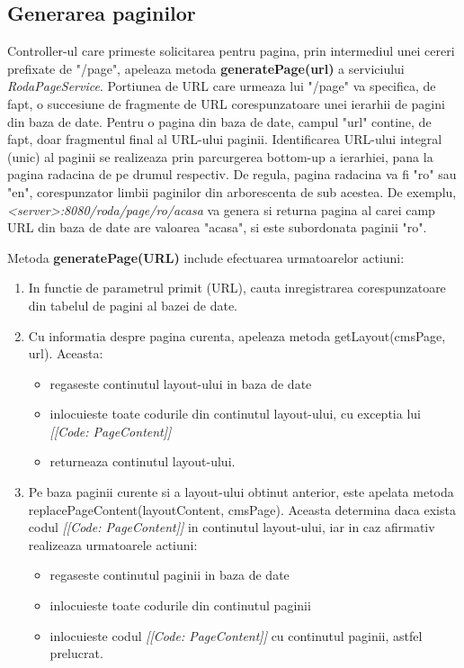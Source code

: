 \subsection{Generarea paginilor}
\label{generarea_paginilor}

Controller-ul care primeste solicitarea pentru pagina, prin intermediul unei cereri prefixate de "/page", apeleaza metoda \textbf{generatePage(url)} a serviciului \emph{RodaPageService}. 
Portiunea de URL care urmeaza lui "/page" va specifica, de fapt, o succesiune de fragmente de URL corespunzatoare unei ierarhii de pagini din baza de date. 
Pentru o pagina din baza de date, campul "url" contine, de fapt, doar fragmentul final al URL-ului paginii. 
Identificarea URL-ului integral (unic) al paginii se realizeaza prin parcurgerea bottom-up a ierarhiei, pana la pagina radacina de pe drumul respectiv. 
De regula, pagina radacina va fi "ro" sau "en", corespunzator limbii paginilor din arborescenta de sub acestea. 
De exemplu, \emph{<server>:8080/roda/page/ro/acasa} va genera si returna pagina al carei camp URL din baza de date are valoarea "acasa", si este subordonata paginii "ro". 

Metoda \textbf{generatePage(URL)} include efectuarea urmatoarelor actiuni:

\begin{enumerate}
\item{In functie de parametrul primit (URL), cauta inregistrarea corespunzatoare din tabelul de pagini al bazei de date.}
\item{Cu informatia despre pagina curenta, apeleaza metoda getLayout(cmsPage, url). Aceasta:}
\begin{itemize}
\item{regaseste continutul layout-ului in baza de date}
\item{inlocuieste toate codurile din continutul layout-ului, cu exceptia lui \emph{[[Code: PageContent]]}}
\item{returneaza continutul layout-ului.}
\end {itemize}
\item{Pe baza paginii curente si a layout-ului obtinut anterior, este apelata metoda replacePageContent(layoutContent, cmsPage). Aceasta determina daca exista codul \emph{[[Code: PageContent]]} in continutul layout-ului, iar in caz afirmativ realizeaza urmatoarele actiuni:}
\begin{itemize}
\item {regaseste continutul paginii in baza de date}
\item{inlocuieste toate codurile din continutul paginii}
\item {inlocuieste codul \emph{[[Code: PageContent]]} cu continutul paginii, astfel prelucrat.}
\end{itemize}
\end{enumerate}

